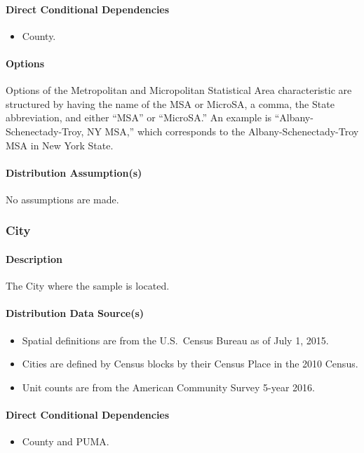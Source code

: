\paragraph{Direct Conditional Dependencies}
\begin{itemize}
    \item County.
\end{itemize}

\paragraph{Options}
Options of the Metropolitan and Micropolitan Statistical Area characteristic are structured by having the name of the MSA or MicroSA, a comma, the State abbreviation, and either ``MSA'' or ``MicroSA.'' An example is ``Albany-Schenectady-Troy, NY MSA,'' which corresponds to the Albany-Schenectady-Troy MSA in New York State.

\paragraph{Distribution Assumption(s)}
No assumptions are made.

\subsubsection{City}
\paragraph{Description}
The City where the sample is located.

\paragraph{Distribution Data Source(s)}
\begin{itemize}
 
\item
  Spatial definitions are from the U.S.~Census Bureau as of July 1,
  2015.
\item
  Cities are defined by Census blocks by their Census Place in the 2010
  Census.
\item
  Unit counts are from the American Community Survey 5-year 2016.
\end{itemize}

\paragraph{Direct Conditional Dependencies}
\begin{itemize}
    \item County and PUMA.
\end{itemize}

